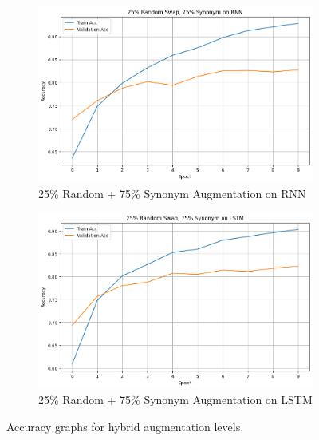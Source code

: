 \documentclass{article}
\begin{document}
\begin{figure}[ht]
  \centering
  \begin{subfigure}[b]{0.45\textwidth}
    \includegraphics[width=\textwidth]{img/random_25_synonym_75_rnn.png}
    \caption{25\% Random + 75\% Synonym Augmentation on RNN}
    \label{fig:random_25_synonym_75_rnn}
  \end{subfigure}
  \hfill
  \begin{subfigure}[b]{0.45\textwidth}
    \includegraphics[width=\textwidth]{img/random_25_synonym_75_lstm.png}
    \caption{25\% Random + 75\% Synonym Augmentation on LSTM}
    \label{fig:random_25_synonym_75_lstm}
  \end{subfigure}
  \caption{Accuracy graphs for hybrid augmentation levels.}
  \label{fig:hybrid_extreme_substitution_acc_2575}
\end{figure}
\end{document}
